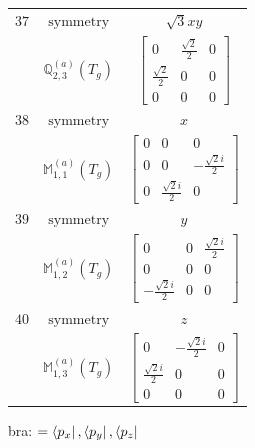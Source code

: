 \documentclass[fleqn,8pt,landscape]{jsarticle}
\begin{document}
\begin{longtable}{ccc}
$ 37 $ & $ \text{symmetry} $ & $ \sqrt{3} x y $ \\
$  $ & $ \mathbb{Q}_{2,3}^{(a)}(T_{g}) $ & $ \begin{bmatrix} 0 & \frac{\sqrt{2}}{2} & 0 \\ \frac{\sqrt{2}}{2} & 0 & 0 \\ 0 & 0 & 0 \end{bmatrix} $ \\ \hline
$ 38 $ & $ \text{symmetry} $ & $ x $ \\
$  $ & $ \mathbb{M}_{1,1}^{(a)}(T_{g}) $ & $ \begin{bmatrix} 0 & 0 & 0 \\ 0 & 0 & - \frac{\sqrt{2} i}{2} \\ 0 & \frac{\sqrt{2} i}{2} & 0 \end{bmatrix} $ \\ \hline
$ 39 $ & $ \text{symmetry} $ & $ y $ \\
$  $ & $ \mathbb{M}_{1,2}^{(a)}(T_{g}) $ & $ \begin{bmatrix} 0 & 0 & \frac{\sqrt{2} i}{2} \\ 0 & 0 & 0 \\ - \frac{\sqrt{2} i}{2} & 0 & 0 \end{bmatrix} $ \\ \hline
$ 40 $ & $ \text{symmetry} $ & $ z $ \\
$  $ & $ \mathbb{M}_{1,3}^{(a)}(T_{g}) $ & $ \begin{bmatrix} 0 & - \frac{\sqrt{2} i}{2} & 0 \\ \frac{\sqrt{2} i}{2} & 0 & 0 \\ 0 & 0 & 0 \end{bmatrix} $ \\ \hline
\end{longtable}
bra: $=\bra{p_{x}}, \bra{p_{y}}, \bra{p_{z}}$
\end{document}
